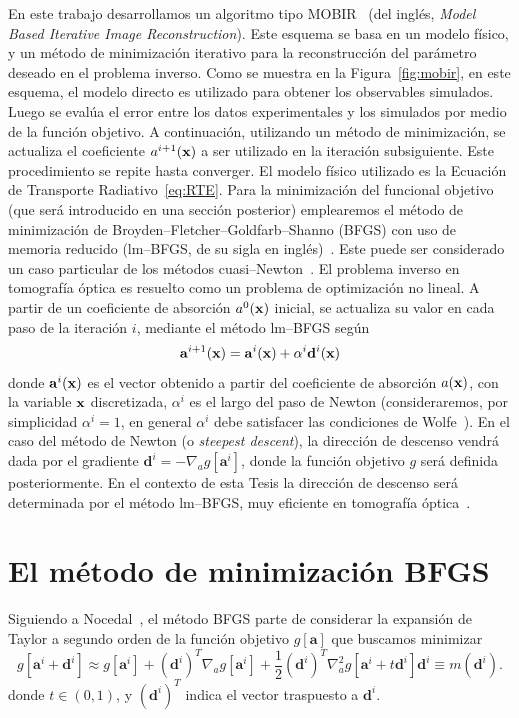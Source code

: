 En este trabajo desarrollamos un algoritmo tipo MOBIR~\cite{Hielscher1999,Kim2010} (del inglés, {\em Model Based Iterative Image  
Reconstruction}). Este esquema se basa en un modelo físico, y un método de minimización 
iterativo para la reconstrucción del parámetro deseado en el problema inverso. 
Como se muestra en la Figura~\ref{fig:mobir}, en este esquema, el modelo directo es utilizado para obtener los observables simulados. Luego se evalúa el error entre los datos experimentales y los simulados por medio de la función objetivo. A continuación, utilizando un método de minimización, se actualiza el coeficiente $a^{i+1}(\mathbf{x})$ a 
  ser utilizado en la iteración subsiguiente. Este 
  procedimiento se repite hasta converger.
El modelo físico utilizado es la Ecuación de Transporte Radiativo~\eqref{eq:RTE}. 
Para la minimización del funcional objetivo (que será introducido en una sección posterior) 
emplearemos el método de minimización 
de Broyden--Fletcher--Goldfarb--Shanno (BFGS) con uso de memoria reducido 
(lm--BFGS, de su sigla en inglés)~\cite{Byrd1995}. Este puede ser considerado un caso particular 
de los métodos cuasi--Newton~\cite{Nocedal2006,Klose2003QN,Ren2006}.
El problema inverso en tomografía óptica es resuelto como un problema de optimización 
no lineal. A partir de un coeficiente de absorción $a^0(\mathbf{x})$ inicial, 
se actualiza su valor  en cada paso de la iteración $i$, 
mediante el método lm--BFGS según~\cite{Klose2003QN}
\begin{equation}
\mathbf{a}^{i+1}(\mathbf{x})=\mathbf{a}^{i}(\mathbf{x})+\alpha^i  \mathbf{d}^i(\mathbf{x})
\label{eq:update}
\end{equation}
donde $\mathbf{a}^{i}(\mathbf{x})$ es el 
vector obtenido a partir del coeficiente de absorción $a(\mathbf{x})$, 
con la variable $\mathbf{x}$ discretizada, $\alpha^i$ es el largo del paso de Newton (consideraremos, por simplicidad $\alpha^i=1$, 
en general $\alpha^i$ debe satisfacer las condiciones de Wolfe~\cite{Nocedal2006}). En el caso del método de Newton (o {\em steepest descent}), la dirección de 
descenso vendrá dada por el gradiente $\mathbf{d}^i=-\nabla_a g[\mathbf{a}^{i}]$, donde la función objetivo $g$ será definida posteriormente. 
En el contexto de esta Tesis la dirección de descenso será determinada por el método lm--BFGS, 
muy eficiente en tomografía óptica~\cite{Klose2003QN,Ren2006,Prieto2017}. 

\section{El método de minimización BFGS}
\label{sec:BFGS}
Siguiendo a Nocedal~\cite[Cap. 2 y 6]{Nocedal2006}, el método BFGS parte de considerar la expansión de 
Taylor a segundo orden de la función objetivo $g[\mathbf{a}]$
que buscamos minimizar
\begin{equation}
g[\mathbf{a}^i+ \mathbf{d}^i]\approx g[\mathbf{a}^i]+ (\mathbf{d}^i)^T \nabla_a g[\mathbf{a}^i]+
\frac{1}{2}(\mathbf{d}^i)^T \nabla_a^2 g[\mathbf{a}^i+t\mathbf{d}^i] \mathbf{d}^i\equiv m(\mathbf{d}^i).
\label{eq:Taylor}
\end{equation}
donde $t \in (0,1)$, y $(\mathbf{d}^i)^T$ indica el vector traspuesto a $\mathbf{d}^i$.


